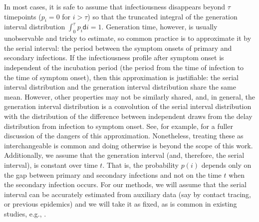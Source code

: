 \documentclass[10pt,letterpaper]{article}
\def\diff{\mathsf{d}}
\newcommand{\citep}[1]{\cite{#1}}
\begin{document}
In most cases, it is safe to assume that infectiousness disappears beyond 
$\tau$ timepoints ($p_i = 0$ for $i > \tau$) so that the truncated integral 
of the generation interval distribution $\int_0^\tau p_i\diff i = 1$.
Generation time, however, is usually unobservable and tricky to estimate, so
common practice is to approximate it by the serial interval: the period between
the symptom onsets of primary and secondary infections. If the infectiousness
profile after symptom onset is independent of the incubation period (the period
from the time of infection to the time of symptom onset), then this
approximation is justifiable: the serial interval distribution and the
generation interval distribution share the same mean. However, other properties
may not be similarly shared, and, in general, the generation interval
distribution is a convolution of the serial interval distribution with the
distribution of the difference between independent draws from the delay
distribution from infection to symptom onset. See, for example,
\cite{gostic2020practical} for a fuller discussion of the dangers of this
approximation. Nonetheless, treating these as interchangeable is common
\citep{cori2013new} and doing otherwise is beyond the scope of this work. 
Additionally, we assume that the generation interval (and, therefore, the 
serial interval), is constant over time $t$. That is, the probability $p(i)$ 
depends only on the gap between primary and secondary infections and not on 
the time $t$ when the secondary infection occurs. For our methods, we will 
assume that the serial interval can be accurately estimated from auxiliary 
data (say by contact tracing, or previous epidemics) and we will take it as 
fixed, as is common in existing studies, e.g., 
\cite{cori2013new,abry2020spatial,pascal2022nonsmooth}.
\end{document}
